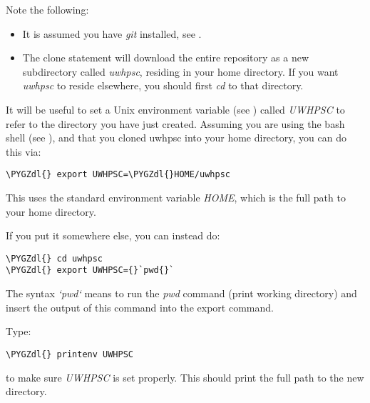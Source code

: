 \documentclass[letterpaper,10pt,english]{sphinxmanual}
\def\PYGZdl{\char`\$}
\begin{document}
Note the following:
\begin{itemize}
\item {} 
It is assumed you have \emph{git} installed, see
{\hyperref[software_installation:software\string-installation]{}}.

\item {} 
The clone statement will download the entire repository as a new
subdirectory called \emph{uwhpsc}, residing in your home directory.  If you
want \emph{uwhpsc} to reside elsewhere, you should first \emph{cd} to that
directory.

\end{itemize}

It will be useful to set a Unix environment variable (see {\hyperref[unix:env]{}}) called
\emph{UWHPSC} to refer to the directory you have just created.  Assuming you are
using the bash shell (see {\hyperref[unix:bash]{}}), and that you cloned uwhpsc
into your home directory, you can do this via:

\begin{Verbatim}[commandchars=\\\{\}]
\PYGZdl{} export UWHPSC=\PYGZdl{}HOME/uwhpsc
\end{Verbatim}

This uses the standard environment variable \emph{HOME}, which is the full path
to your home directory.

If you put it somewhere else, you can instead do:

\begin{Verbatim}[commandchars=\\\{\}]
\PYGZdl{} cd uwhpsc
\PYGZdl{} export UWHPSC={}`pwd{}`
\end{Verbatim}

The syntax
\emph{{}`pwd{}`} means to run the \emph{pwd} command (print working directory) and insert the
output of this command into the export command.

Type:

\begin{Verbatim}[commandchars=\\\{\}]
\PYGZdl{} printenv UWHPSC
\end{Verbatim}

to make sure \emph{UWHPSC} is set properly. This should print the full path to the
new directory.
\end{document}
